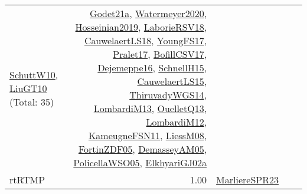 {\begin{longtable}{p{3cm}r>{\raggedright\arraybackslash}p{6cm}>{\raggedright\arraybackslash}p{6cm}>{\raggedright\arraybackslash}p{8cm}}
\hyperref[detail:SchuttW10]{SchuttW10}, \hyperref[detail:LiuGT10]{LiuGT10} (Total: 35) & \hyperref[detail:Godet21a]{Godet21a}, \hyperref[detail:Watermeyer2020]{Watermeyer2020}, \hyperref[detail:Hosseinian2019]{Hosseinian2019}, \hyperref[detail:LaborieRSV18]{LaborieRSV18}, \hyperref[detail:CauwelaertLS18]{CauwelaertLS18}, \hyperref[detail:YoungFS17]{YoungFS17}, \hyperref[detail:Pralet17]{Pralet17}, \hyperref[detail:BofillCSV17]{BofillCSV17}, \hyperref[detail:Dejemeppe16]{Dejemeppe16}, \hyperref[detail:SchnellH15]{SchnellH15}, \hyperref[detail:CauwelaertLS15]{CauwelaertLS15}, \hyperref[detail:ThiruvadyWGS14]{ThiruvadyWGS14}, \hyperref[detail:LombardiM13]{LombardiM13}, \hyperref[detail:OuelletQ13]{OuelletQ13}, \hyperref[detail:LombardiM12]{LombardiM12}, \hyperref[detail:KameugneFSN11]{KameugneFSN11}, \hyperref[detail:LiessM08]{LiessM08}, \hyperref[detail:FortinZDF05]{FortinZDF05}, \hyperref[detail:DemasseyAM05]{DemasseyAM05}, \hyperref[detail:PolicellaWSO05]{PolicellaWSO05}, \hyperref[detail:ElkhyariGJ02a]{ElkhyariGJ02a}\\
\index{rtRTMP}\index{Classification!rtRTMP}rtRTMP &  1.00 & \hyperref[detail:MarliereSPR23]{MarliereSPR23} &  & \\

\end{longtable}}
